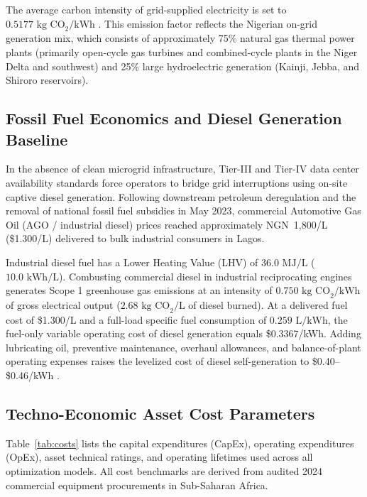 \documentclass[11pt,a4paper]{article}
\begin{document}
The average carbon intensity of grid-supplied electricity is set to $0.5177\text{ kg CO}_2/\text{kWh}$ \cite{Babatunde2020}. This emission factor reflects the Nigerian on-grid generation mix, which consists of approximately 75\% natural gas thermal power plants (primarily open-cycle gas turbines and combined-cycle plants in the Niger Delta and southwest) and 25\% large hydroelectric generation (Kainji, Jebba, and Shiroro reservoirs).

\subsection{Fossil Fuel Economics and Diesel Generation Baseline}
\label{sec:diesel_economics}
In the absence of clean microgrid infrastructure, Tier-III and Tier-IV data center availability standards force operators to bridge grid interruptions using on-site captive diesel generation. Following downstream petroleum deregulation and the removal of national fossil fuel subsidies in May 2023, commercial Automotive Gas Oil (AGO / industrial diesel) prices reached approximately NGN~1,800/L (\$1.300/L) delivered to bulk industrial consumers in Lagos.

Industrial diesel fuel has a Lower Heating Value (LHV) of $36.0\text{ MJ/L}$ ($10.0\text{ kWh/L}$). Combusting commercial diesel in industrial reciprocating engines generates Scope 1 greenhouse gas emissions at an intensity of $0.750\text{ kg CO}_2/\text{kWh}$ of gross electrical output ($2.68\text{ kg CO}_2/\text{L}$ of diesel burned). At a delivered fuel cost of \$1.300/L and a full-load specific fuel consumption of $0.259\text{ L/kWh}$, the fuel-only variable operating cost of diesel generation equals \$0.3367/kWh. Adding lubricating oil, preventive maintenance, overhaul allowances, and balance-of-plant operating expenses raises the levelized cost of diesel self-generation to \$0.40--\$0.46/kWh \cite{WorldBank2020}.

\subsection{Techno-Economic Asset Cost Parameters}
\label{sec:cost_parameters}
Table~\ref{tab:costs} lists the capital expenditures (CapEx), operating expenditures (OpEx), asset technical ratings, and operating lifetimes used across all optimization models. All cost benchmarks are derived from audited 2024 commercial equipment procurements in Sub-Saharan Africa.
\end{document}
